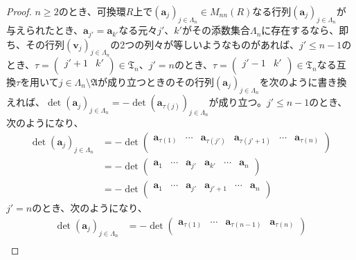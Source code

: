 \documentclass[dvipdfmx]{jsarticle}
\begin{document}
\begin{proof}
$n \geq 2$のとき、可換環$R$上で$\left( \mathbf{a}_{j} \right)_{j \in \varLambda_{n}} \in M_{nn}(R)$なる行列$\left( \mathbf{a}_{j} \right)_{j \in \varLambda_{n}}$が与えられたとき、$\mathbf{a}_{j'} = \mathbf{a}_{k'}$なる元々$j'$、$k'$がその添数集合$\varLambda_{n}$に存在するなら、即ち、その行列$\left( \mathbf{v}_{j} \right)_{j \in \varLambda_{n}}$の2つの列々が等しいようなものがあれば、$j' \leq n - 1$のとき、$\tau = \begin{pmatrix}
j' + 1 & k' \\
\end{pmatrix} \in \mathfrak{T}_{n}$、$j' = n$のとき、$\tau = \begin{pmatrix}
j' - 1 & k' \\
\end{pmatrix} \in \mathfrak{T}_{n}$なる互換$\tau$を用いて$j \in \varLambda_{n}\mathfrak{\setminus A}$が成り立つときのその行列$\left( \mathbf{a}_{j} \right)_{j \in \varLambda_{n}}$を次のように書き換えれば、$\det\left( \mathbf{a}_{j} \right)_{j \in \varLambda_{n}} = - \det\left( \mathbf{a}_{\tau(j)} \right)_{j \in \varLambda_{n}}$が成り立つ。$j' \leq n - 1$のとき、次のようになり、
\begin{align*}
\det\left( \mathbf{a}_{j} \right)_{j \in \varLambda_{n}} &= - \det\begin{pmatrix}
\mathbf{a}_{\tau(1)} & \cdots & \mathbf{a}_{\tau\left( j' \right)} & \mathbf{a}_{\tau\left( j' + 1 \right)} & \cdots & \mathbf{a}_{\tau(n)} \\
\end{pmatrix}\\
&= - \det\begin{pmatrix}
\mathbf{a}_{1} & \cdots & \mathbf{a}_{j'} & \mathbf{a}_{k'} & \cdots & \mathbf{a}_{n} \\
\end{pmatrix}\\
&= - \det\begin{pmatrix}
\mathbf{a}_{1} & \cdots & \mathbf{a}_{j'} & \mathbf{a}_{j' + 1} & \cdots & \mathbf{a}_{n} \\
\end{pmatrix}
\end{align*}
$j' = n$のとき、次のようになり、
\begin{align*}
\det\left( \mathbf{a}_{j} \right)_{j \in \varLambda_{n}} &= - \det\begin{pmatrix}
\mathbf{a}_{\tau(1)} & \cdots & \mathbf{a}_{\tau(n - 1)} & \mathbf{a}_{\tau(n)} \\
\end{pmatrix}\\

\end{align*}
\end{proof}
\end{document}
